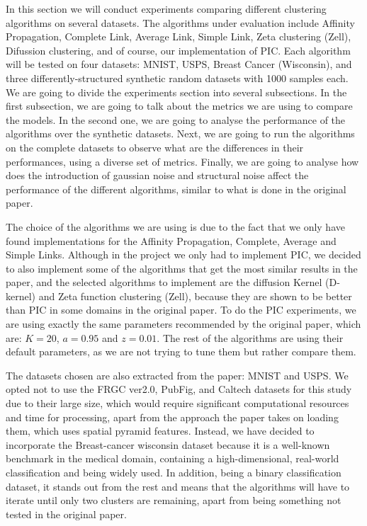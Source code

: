 \documentclass[
	10pt,
	parskip=half-,	
	paper=a4,
	english
	]{scrartcl}
\begin{document}
In this section we will conduct experiments comparing different clustering algorithms on several datasets. The algorithms under evaluation include Affinity Propagation, Complete Link, Average Link, Simple Link, Zeta clustering (Zell), Difussion clustering, and of course, our implementation of PIC. Each algorithm will be tested on four datasets: MNIST, USPS, Breast Cancer (Wisconsin), and three differently-structured synthetic random datasets with 1000 samples each. We are going to divide the experiments section into several subsections. In the first subsection, we are going to talk about the metrics we are using to compare the models. In the second one, we are going to analyse the performance of the algorithms over the synthetic datasets. Next, we are going to run the algorithms on the complete datasets to observe what are the differences in their performances, using a diverse set of metrics. Finally, we are going to analyse how does the introduction of gaussian noise and structural noise affect the performance of the different algorithms, similar to what is done in the original paper.

The choice of the algorithms we are using is due to the fact that we only have found implementations for the Affinity Propagation, Complete, Average and Simple Links. Although in the project we only had to implement PIC, we decided to also implement some of the algorithms that get the most similar results in the paper, and the selected algorithms to implement are the diffusion Kernel (D-kernel) and Zeta function clustering (Zell), because they are shown to be better than PIC in some domains in the original paper. To do the PIC experiments, we are using exactly the same parameters recommended by the original paper, which are: \(K=20\), \(a=0.95\) and \(z=0.01\). The rest of the algorithms are using their default parameters, as we are not trying to tune them but rather compare them.

The datasets chosen are also extracted from the paper: MNIST and USPS. We opted not to use the FRGC ver2.0, PubFig, and Caltech datasets for this study due to their large size, which would require significant computational resources and time for processing, apart from the approach the paper takes on loading them, which uses spatial pyramid features. Instead, we have decided to incorporate the Breast-cancer wisconsin dataset because it is a well-known benchmark in the medical domain, containing a high-dimensional, real-world classification and being widely used. In addition, being a binary classification dataset, it stands out from the rest and means that the algorithms will have to iterate until only two clusters are remaining, apart from being something not tested in the original paper.
\end{document}
